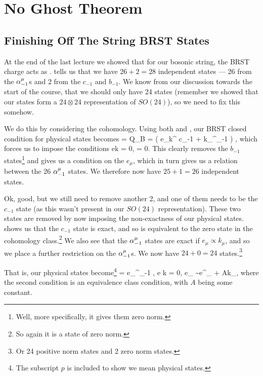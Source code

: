 \chapter{No Ghost Theorem}

\section{Finishing Off The String BRST States}

At the end of the last lecture we showed that for our bosonic string, the BRST charge acts as .  tells us that we have $26+2=28$ independent states --- 26 from the $\alpha^{\mu}_{-1}$s and 2 from the $c_{-1}$ and $b_{-1}$. We know from our discussion towards the start of the course, that we should only have 24 states (remember we showed that our states form a $24\otimes 24$ representation of $SO(24)$), so we need to fix this somehow.

We do this by considering the cohomology. Using both  and , our BRST closed condition for physical states becomes
 = Q_B\ket{\psi} = \big( e_{\mu}k^{\mu} c_{-1} + \beta k_{\mu}\a^{\mu}_{-1} \big) ,
\ese
which forces us to impose the conditions 
\bse 
    e\cdot k = 0, \qand \beta = 0.
\ese 
This clearly removes the $b_{-1}$ states\footnote{Well, more specifically, it gives them zero norm.} and gives us a condition on the $e_{\mu}$, which in turn gives us a relation between the 26 $\alpha^{\mu}_{-1}$ states. We therefore now have $25+1=26$ independent states. 

Ok, good, but we still need to remove another 2, and one of them needs to be the $c_{-1}$ state (as this wasn't present in our $SO(24)$ representation). These two states are removed by now imposing the non-exactness of our physical states.  shows us that the $c_{-1}$ state is exact, and so is equivalent to the zero state in the cohomology class.\footnote{So again it is a state of zero norm.} We also see that the $\alpha^{\mu}_{-1}$ states are exact if $e_{\mu} \propto k_{\mu}$, and so we place a further restriction on the $\alpha^{\mu}_{-1}$s. We now have $24+0=24$ states.\footnote{Or 24 positive norm states and 2 zero norm states.}

That is, our physical states become\footnote{The subscript $p$ is included to show we mean physical states.}
\bse 
     =  e_{\mu}\a^{\mu}_{-1} , \qquad e \cdot k = 0, \qand e_{\mu} \sim e^{\prime}_{\mu} + Ak_{\mu},
\ese 
where the second condition is an equivalence class condition, with $A$ being some constant.

